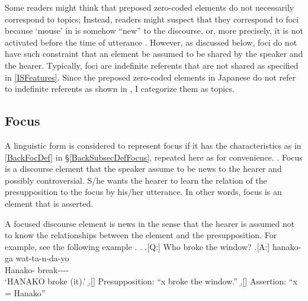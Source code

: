 %

Some readers might think that preposed zero-coded elements do not necessarily correspond to topics;
Instead, readers might suspect that they correspond to foci
because  `mouse' in \LLast is somehow ``new'' to the discourse,
or, more precisely,
it is not activated before the time of utterance \LLast[Y].
However, as discussed below,
foci do not have such constraint that an element be assumed to be shared by the speaker and the hearer.
Typically, foci are indefinite referents that are not shared as specified in \ref{ISFeatures}.
Since the preposed zero-coded elements in Japanese do not refer to indefinite referents as shown in \Last,
I categorize them as topics.

\subsection{Focus}\label{FrameworkFocus}

A linguistic form is considered to represent focus if it has the characteristics as in \ref{BackFocDef} in \S \ref{BackSubsecDefFocus},
repeated here as \Next for convenience.
%
\ex. Focus is a discourse element that the speaker assume to be news to the hearer and possibly controversial.
S/he wants the hearer to learn the relation of the presupposition to the focus by his/her utterance.
In other words, focus is an element that is asserted.
\label{FocDef}

A focused discourse element is news in the sense that
the hearer is assumed not to know the relationships between the element and the presupposition.
For example,
see the following example \Next.
\ex. \a.[Q:] Who broke the window?
	\bg.[A:] hanako-ga wat-ta-n-da-yo \\
		Hanako- break---- \\
		`HANAKO broke (it).'
	\b.[] Presupposition: ``x broke the window.''
	\b.[] Assertion: ``x = Hanako''

